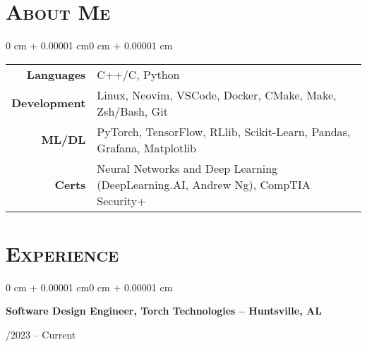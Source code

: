 \documentclass[10pt, letterpaper]{article}
\newenvironment{onecolentry}{
    \begin{adjustwidth}{0 cm + 0.00001 cm}{0 cm + 0.00001 cm}
}{
    \end{adjustwidth}
}
\newenvironment{twocolentry}[1]{
    \onecolentry
    \def\secondColumn{#1}
    \setcolumnwidth{\fill,4.5cm}
    \begin{paracol}{2}
}{
    \switchcolumn \raggedleft \secondColumn
    \end{paracol}
    \endonecolentry
}
\begin{document}
\section{\scshape About Me}

\begin{onecolentry}
\begin{tabular}{@{}r l@{}}
\textbf{Languages} & C++/C, Python \\
\textbf{Development} & Linux, Neovim, VSCode, Docker, CMake, Make, Zsh/Bash, Git \\
\textbf{ML/DL} & PyTorch, TensorFlow, RLlib, Scikit-Learn, Pandas, Grafana, Matplotlib \\
\textbf{Certs} & Neural Networks and Deep Learning (DeepLearning.AI, Andrew Ng), CompTIA Security+ \\
\end{tabular}
\end{onecolentry}


\section{\scshape Experience}

\begin{twocolentry}{05/2023 – Current}
    \textbf{Software Design Engineer, Torch Technologies – Huntsville, AL}
\end{twocolentry}
\end{document}
